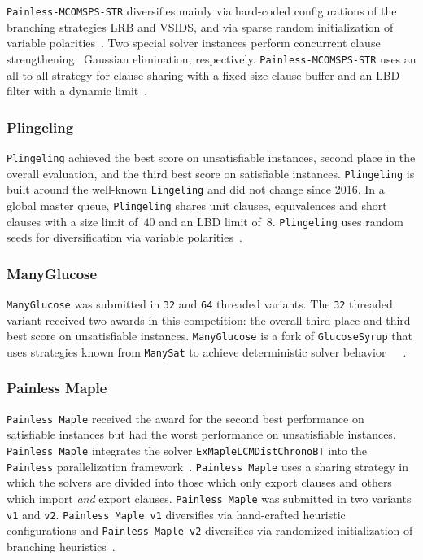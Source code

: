 \documentclass{elsarticle}
\newcommand{\solver}[1]{\texttt{#1}}
\begin{document}
\solver{Painless-MCOMSPS-STR} diversifies mainly via hard-coded configurations of the branching strategies LRB and VSIDS, and via sparse random initialization of variable polarities~\cite{Balyo:2015:HordeSATs}. 
Two special solver instances perform concurrent clause strengthening~\cite{Wieringa:2013:CCS} Gaussian elimination, respectively. 
\solver{Painless-MCOMSPS-STR} uses an all-to-all strategy for clause sharing with a fixed size clause buffer and an LBD filter with a dynamic limit~\cite{SC2020}. 


\subsubsection{Plingeling} 

\solver{Plingeling} achieved the best score on unsatisfiable instances, second place in the overall evaluation, and the third best score on satisfiable instances. 
\solver{Plingeling} is built around the well-known \solver{Lingeling} and did not change since 2016. 
In a global master queue, \solver{Plingeling} shares unit clauses, equivalences and short clauses with a size limit of~$40$ and an LBD limit of~$8$. 
\solver{Plingeling} uses random seeds for diversification via variable polarities~\cite{Biere:SC2020,Biere:2012:Lingeling}. 


\subsubsection{ManyGlucose}

\solver{ManyGlucose} was submitted in \solver{32} and \solver{64} threaded variants. 
The \solver{32} threaded variant received two awards in this competition: the overall third place and third best score on unsatisfiable instances. 
\solver{ManyGlucose} is a fork of \solver{GlucoseSyrup} that uses strategies known from \solver{ManySat} to achieve deterministic solver behavior~\cite{Audemard:2018:GlucoseSyrup}~\cite{Audemard:2014:LazyClauseExchange}~\cite{Hamadi:2009:ManySat}. 


\subsubsection{Painless Maple} 

\solver{Painless Maple} received the award for the second best performance on satisfiable instances but had the worst performance on unsatisfiable instances. 
\solver{Painless Maple} integrates the solver \solver{ExMapleLCMDistChronoBT} into the \solver{Painless} parallelization framework~\cite{Frioux:2017:Painless}. 
\solver{Painless Maple} uses a sharing strategy in which the solvers are divided into those which only export clauses and others which import \emph{and} export clauses. 
\solver{Painless Maple} was submitted in two variants \solver{v1} and \solver{v2}. 
\solver{Painless Maple v1} diversifies via hand-crafted heuristic configurations and \solver{Painless Maple v2} diversifies via randomized initialization of branching heuristics~\cite{SC2020}. 
\end{document}
